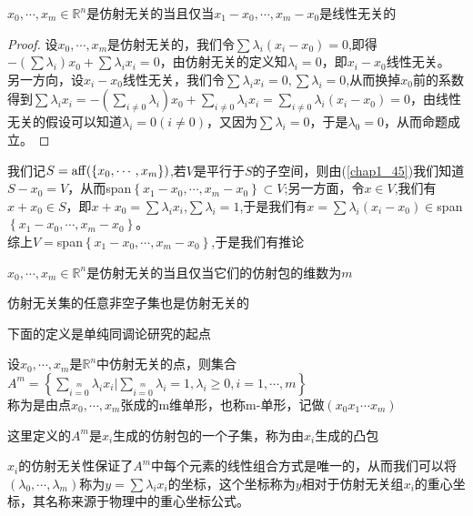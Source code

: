 \begin{proposition}
$x_{0},\cdots,x_{m}\in\mathbb{R}^{n}$是仿射无关的当且仅当$x_{1}-x_{0},\cdots,x_{m}-x_{0}$是线性无关的
\end{proposition}
\begin{proof}
设$x_{0},\cdots,x_{m}$是仿射无关的，我们令$\sum\lambda_{i}(x_{i}-x_{0})=0$,即得$-(\sum\lambda_{i})x_{0}+\sum\lambda_{i}x_{i}=0$，由仿射无关的定义知$\lambda_{i}=0$，即$x_{i}-x_{0}$线性无关。\\
另一方向，设$x_{i}-x_{0}$线性无关，我们令$\sum\lambda_{i}x_{i}=0,\sum\lambda_{i}=0$,从而换掉$x_{0}$前的系数得到$\sum\lambda_{i}x_{i}=-\left(\sum\limits_{i\neq0}\lambda_{i}\right)x_{0}+\sum\limits_{i\neq0}\lambda_{i}x_{i}=\sum\limits_{i\neq0}\lambda_{i}(x_{i}-x_{0})=0$，由线性无关的假设可以知道$\lambda_{i}=0(i\neq0)$，又因为$\sum\lambda_{i}=0$，于是$\lambda_{0}=0$，从而命题成立。
\end{proof}
我们记$S={\rm aff}(\left\{x_{0},\cdots,x_{m}\right\})$,若$V$是平行于$S$的子空间，则由(\ref{chap1_45})我们知道$S-x_{0}=V$，从而span$\left\{x_{1}-x_{0},\cdots,x_{m}-x_{0}\right\}\subset V$;另一方面，令$x\in V$,我们有$x+x_{0}\in S$，即$x+x_{0}=\sum\lambda_{i}x_{i}$,$\sum\lambda_{i}=1$,于是我们有$x=\sum\lambda_{i}(x_{i}-x_{0})\in$span$\left\{x_{1}-x_{0},\cdots,x_{m}-x_{0}\right\}$。\\
综上$V=$span$\left\{x_{1}-x_{0},\cdots,x_{m}-x_{0}\right\}$,于是我们有推论
\begin{corollary}
$x_{0},\cdots,x_{m}\in\mathbb{R}^{n}$是仿射无关的当且仅当它们的仿射包的维数为$m$
\end{corollary}
\begin{corollary}
仿射无关集的任意非空子集也是仿射无关的
\end{corollary}
下面的定义是单纯同调论研究的起点
\begin{definition}[m-单形]
设$x_{0},\cdots,x_{m}$是$\mathbb{R}^{n}$中仿射无关的点，则集合\\
$A^{m}=\left\{\sum\limits_{i=0}\limits^{m}\lambda_{i}x_{i}|\sum\limits_{i=0}\limits^{m}\lambda_{i}=1,\lambda_{i}\geq0,i=1,\cdots,m\right\}$\\称为是由点$x_{0},\cdots,x_{m}$张成的m维单形，也称m-单形，记做$(x_{0}x_{1}\cdots x_{m})$
\end{definition}
\begin{remark}
这里定义的$A^{m}$是$x_{i}$生成的仿射包的一个子集，称为由$x_{i}$生成的凸包
\end{remark}
\begin{remark}
$x_{i}$的仿射无关性保证了$A^{m}$中每个元素的线性组合方式是唯一的，从而我们可以将$(\lambda_{0},\cdots,\lambda_{m})$称为$y=\sum\lambda_{i}x_{i}$的坐标，这个坐标称为$y$相对于仿射无关组$x_{i}$的重心坐标，其名称来源于物理中的重心坐标公式。
\end{remark}
